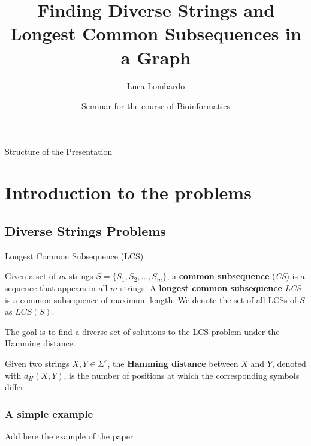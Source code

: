 \documentclass{beamer}
\title{Finding Diverse Strings and Longest Common Subsequences in a Graph}
\author{Luca Lombardo}
\date{Seminar for the course of Bioinformatics}
\begin{document}
\begin{frame}
    \titlepage
\end{frame}


\begin{frame}{Structure of the Presentation}
    \tableofcontents
\end{frame}

\section{Introduction to the problems}
\subsection{Diverse Strings Problems}
\begin{frame}{Longest Common Subsequence (LCS)}
\begin{definition}
    Given a set of $m$ strings $S = \{ S_1, S_2, \ldots, S_m \}$, a \textbf{common subsequence} (\emph{CS}) is a sequence that appears in all $m$ strings. A \textbf{longest common subsequence} \emph{LCS} is a common subsequence of maximum length. We denote the set of all LCSs of $S$ as $LCS(S)$.
\end{definition}
The goal is to find a diverse set of solutions to the LCS problem under the Hamming distance.
\begin{definition}
    Given two strings $X, Y \in \Sigma^r$, the \textbf{Hamming distance} between $X$ and $Y$, denoted with $d_H(X,Y)$, is the number of positions at which the corresponding symbols differ.
\end{definition}
\end{frame}



\begin{frame}
    \frametitle{A simple example}
    Add here the example of the paper


\end{frame}
\end{document}
